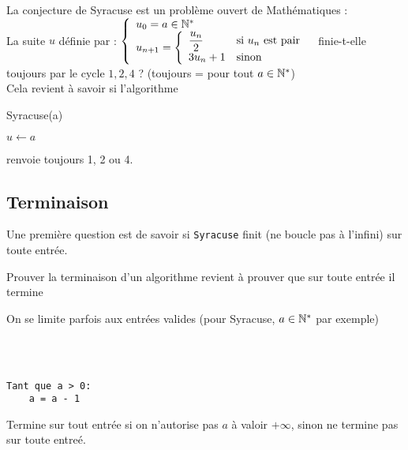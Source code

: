 
La conjecture de Syracuse est un problème ouvert de Mathématiques : \\
La suite $u$ définie par : $\left\{ \begin{array}{l}
	u_0 = a \in \mathbb{N}^*\\
	u_{n+1} = \left\{\begin{array}{ll}
		\dfrac{u_n}{2} & \text{si } u_n \text{ est pair}\\
		3u_n+1 & \text{sinon}
	\end{array}\right.
\end{array}\right.$ finie-t-elle toujours par le cycle $1,2,4$ ? (toujours = pour tout $a\in \mathbb{N}^*$)\\

Cela revient à savoir si l'algorithme \\
\begin{algorithm}[H]
	\caption{Syracuse(a)}
	$u \gets a$\\
\end{algorithm}
renvoie toujours 1, 2 ou 4.

\subsection{Terminaison}
Une première question est de savoir si \texttt{Syracuse} finit (ne boucle pas à l'infini) sur toute entrée.

\begin{definition}
	Prouver la terminaison d'un algorithme revient à prouver que sur toute entrée il termine
\end{definition}

\begin{rem}
	On se limite parfois aux entrées valides (pour Syracuse, $a \in \mathbb{N}^*$ par exemple)
\end{rem}

\begin{example}
	\enspace \\ \\
	\begin{minipage}{0.4\linewidth}
		\begin{lstlisting}
Tant que a > 0:
    a = a - 1
		\end{lstlisting}
	\end{minipage} \quad \begin{minipage}{0.5\linewidth}
		Termine sur tout entrée si on n'autorise pas $a$ à valoir $+\infty$, sinon ne termine pas sur toute entreé.
	\end{minipage}
\end{example}

